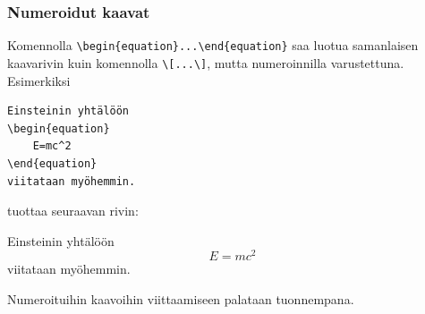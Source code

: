 %
\begin{frame}[fragile]
    
    
\end{frame}
\begin{frame}[fragile]
    \frametitle{Numeroidut kaavat}
Komennolla \verb-\begin{equation}...\end{equation}- saa luotua samanlaisen kaavarivin kuin komennolla \verb-\[...\]-, mutta numeroinnilla varustettuna. \pause Esimerkiksi

    \begin{scriptsize}
        \begin{Verbatim}[frame=single]
Einsteinin yhtälöön
\begin{equation}
    E=mc^2
\end{equation}
viitataan myöhemmin.
        \end{Verbatim}
    \end{scriptsize}

    tuottaa seuraavan rivin:
    \begin{sample}
        Einsteinin yhtälöön
        \begin{equation}
            E=mc^2
        \end{equation}
        viitataan myöhemmin.
    \end{sample}
    \pause
    Numeroituihin kaavoihin viittaamiseen palataan tuonnempana.
\end{frame}
